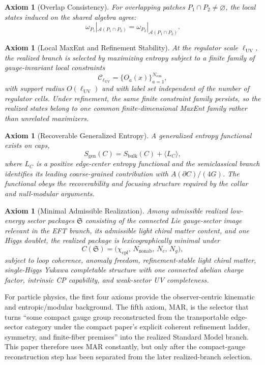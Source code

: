 \documentclass[11pt]{article}
\newtheorem{axiom}[theorem]{Axiom}
\begin{document}
\begin{axiom}[Overlap Consistency]\label{ax:overlap}
For overlapping patches \(P_1\cap P_2\neq\varnothing\), the local states induced on the shared
algebra agree:
\[
\omega_{P_1}|_{\mathcal A(P_1\cap P_2)}
=
\omega_{P_2}|_{\mathcal A(P_1\cap P_2)}.
\]
\end{axiom}

\begin{axiom}[Local MaxEnt and Refinement Stability]\label{ax:maxent}
At the regulator scale \(\ell_{\mathrm{UV}}\), the realized branch is selected by maximizing
entropy subject to a finite family of gauge-invariant local constraints
\[
\mathcal C_{\ell_{\mathrm{UV}}}=\{O_a(x)\}_{a=1}^{N_{\mathrm{con}}},
\]
with support radius \(O(\ell_{\mathrm{UV}})\) and with label set independent of the number of
regulator cells. Under refinement, the same finite constraint family persists, so the realized
states belong to one common finite-dimensional MaxEnt family rather than unrelated maximizers.
\end{axiom}

\begin{axiom}[Recoverable Generalized Entropy]\label{ax:entropy}
A generalized entropy functional exists on caps,
\[
S_{\mathrm{gen}}(C)=S_{\mathrm{bulk}}(C)+\langle L_C\rangle,
\]
where \(L_C\) is a positive edge-center entropy functional and the semiclassical branch
identifies its leading coarse-grained contribution with \(A(\partial C)/(4G)\). The functional
obeys the recoverability and focusing structure required by the collar and null-modular
arguments.
\end{axiom}

\begin{axiom}[Minimal Admissible Realization]\label{ax:mar}
Among admissible realized low-energy sector packages \(\mathfrak S\) consisting of the connected
Lie gauge-sector image relevant in the EFT branch, its admissible light chiral matter content,
and one Higgs doublet, the realized package is lexicographically minimal under
\[
C(\mathfrak S)=\bigl(\chi_{\mathrm{cpl}},\,N_{\mathrm{nonab}},\,N_c,\,N_g\bigr),
\]
subject to loop coherence, anomaly freedom, refinement-stable light chiral matter,
single-Higgs Yukawa completable structure with one connected abelian charge factor, intrinsic
CP capability, and weak-sector UV completeness.
\end{axiom}

For particle physics, the first four axioms provide the observer-centric kinematic and
entropic/modular background. The fifth axiom, MAR, is the selector that turns ``some compact
gauge group reconstructed from the transportable edge-sector category under the compact paper's
explicit coherent refinement ladder, symmetry, and finite-fiber premises'' into the realized Standard Model branch. This
paper therefore uses MAR constantly, but only after the compact-gauge reconstruction step has
been separated from the later realized-branch selection.
\end{document}
